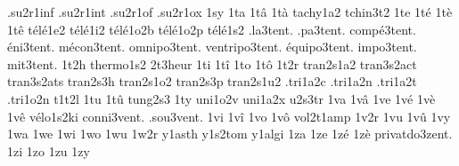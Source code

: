 {                    .su2r1inf
                    .su2r1int
                    .su2r1of
                    .su2r1ox
1sy
1ta
1t\^a
1t\`a
                    tachy1a2
                    tchin3t2
1te
1t\'e
1t\`e
1t\^e
                    t\'el\'e1e2
                    t\'el\'e1i2
                    t\'el\'e1o2b
                    t\'el\'e1o2p
                    t\'el\'e1s2
     .la3tent.
     .pa3tent.
 comp\'e3tent.
   \'eni3tent.
 m\'econ3tent.
  omnipo3tent.
ventripo3tent.
\'equipo3tent.
    impo3tent.
     mit3tent.
1t2h
                    thermo1s2
                    2t3heur
1ti
1t\^i
1to
1t\^o
1t2r
                    tran2s1a2
                    tran3s2act
                    tran3s2ats
                    tran2s3h
                    tran2s1o2
                    tran2s3p
                    tran2s1u2
                    .tri1a2c
                    .tri1a2n
                    .tri1a2t
                    .tri1o2n
                    t1t2l
1tu
1t\^u
tung2s3
1ty
                    uni1o2v
                    uni1a2x
                    u2s3tr
1va
1v\^a
1ve
1v\'e
1v\`e
1v\^e
                    v\'elo1s2ki
conni3vent.
 .sou3vent.
1vi
1v\^i
1vo
1v\^o
                    vol2t1amp
1v2r
1vu
1v\^u
1vy
1wa
1we
1wi
1wo
1wu
1w2r
                    y1asth
                    y1s2tom
                    y1algi
1za
1ze
1z\'e
1z\`e
privatdo3zent.
1zi
1zo
1zu
1zy
}
\endgroup
\endinput

